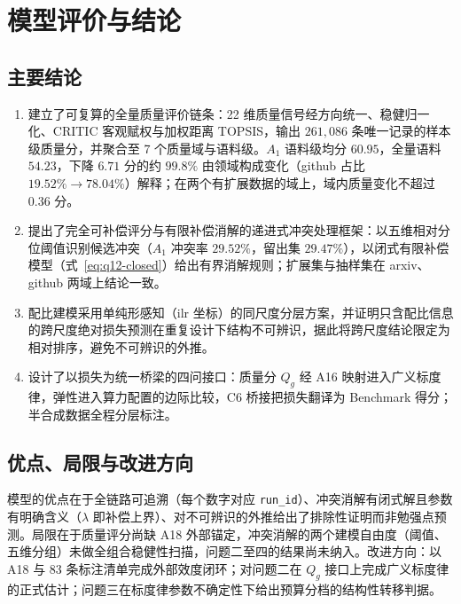 \section{模型评价与结论}
\label{sec:conclusion}

\subsection{主要结论}
\begin{enumerate}
  \item 建立了可复算的全量质量评价链条：22 维质量信号经方向统一、稳健归一化、CRITIC 客观赋权与加权距离 TOPSIS，输出 $261{,}086$ 条唯一记录的样本级质量分，并聚合至 7 个质量域与语料级。$A_1$ 语料级均分 $60.95$，全量语料 $54.23$，下降 $6.71$ 分的约 $99.8\%$ 由领域构成变化（github 占比 $19.52\%\to78.04\%$）解释；在两个有扩展数据的域上，域内质量变化不超过 $0.36$ 分。
  \item 提出了完全可补偿评分与有限补偿消解的递进式冲突处理框架：以五维相对分位阈值识别候选冲突（$A_1$ 冲突率 $29.52\%$，留出集 $29.47\%$），以闭式有限补偿模型（式~\ref{eq:q12-closed}）给出有界消解规则；扩展集与抽样集在 arxiv、github 两域上结论一致。
  \item 配比建模采用单纯形感知（ilr 坐标）的同尺度分层方案，并证明只含配比信息的跨尺度绝对损失预测在重复设计下结构不可辨识，据此将跨尺度结论限定为相对排序，避免不可辨识的外推。
  \item 设计了以损失为统一桥梁的四问接口：质量分 $Q_g$ 经 A16 映射进入广义标度律，弹性进入算力配置的边际比较，C6 桥接把损失翻译为 Benchmark 得分；半合成数据全程分层标注。
\end{enumerate}

\subsection{优点、局限与改进方向}
模型的优点在于全链路可追溯（每个数字对应 \texttt{run\_id}）、冲突消解有闭式解且参数有明确含义（$\lambda$ 即补偿上界）、对不可辨识的外推给出了排除性证明而非勉强点预测。局限在于质量评分尚缺 A18 外部锚定，冲突消解的两个建模自由度（阈值、五维分组）未做全组合稳健性扫描，问题二至四的结果尚未纳入。改进方向：以 A18 与 83 条标注清单完成外部效度闭环；对问题二在 $Q_g$ 接口上完成广义标度律的正式估计；问题三在标度律参数不确定性下给出预算分档的结构性转移判据。
